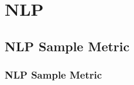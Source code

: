 \chapter{NLP}


\clearpage
\thispagestyle{clusteringstyle}
\section{NLP Sample Metric}
\subsection{NLP Sample Metric}